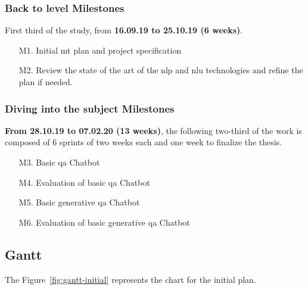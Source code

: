 \subsubsection{Back to level Milestones}
First third of the study, from \textbf{16.09.19 to 25.10.19 (6 weeks)}.
\begin{enumerate}
    \setlength\itemsep{0em}
    \item[M1.] Initial \gls{mt} plan and project specification
    \item[M2.] Review the state of the art of the \gls{nlp} and \gls{nlu} technologies and refine the plan if needed.
\end{enumerate}


\subsubsection{Diving into the subject Milestones}
\textbf{From 28.10.19 to 07.02.20 (13 weeks)}, the following two-third of the work is composed of 6 sprints of two weeks each and one week to finalize the thesis.
\begin{itemize}
    \setlength\itemsep{0em}
    \item[M3.] Basic \gls{qa} Chatbot
    \item[M4.] Evaluation of basic \gls{qa} Chatbot
    \item[M5.] Basic generative \gls{qa} Chatbot
    \item[M6.] Evaluation of basic generative \gls{qa} Chatbot
\end{itemize}

\subsection{Gantt}
The Figure~\ref{fig:gantt-initial} represents the chart for the initial plan.



